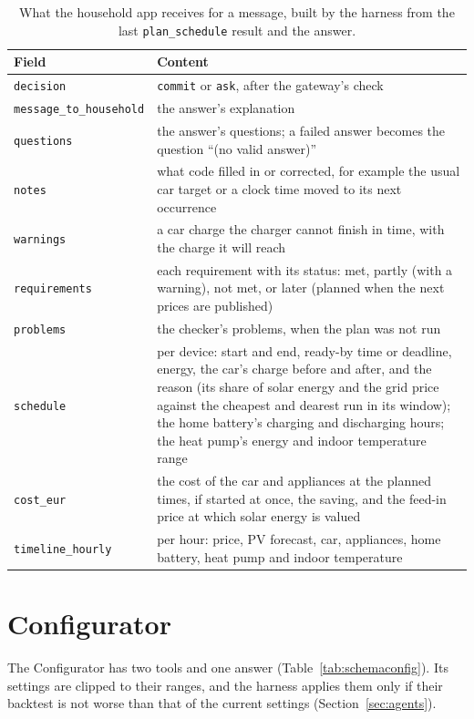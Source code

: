 \begin{table}[htbp]
\caption{What the household app receives for a message, built by the
harness from the last \texttt{plan\_schedule} result and the answer.}
\label{tab:schemaapp}
\small
\begin{tabularx}{\textwidth}{@{}>{\raggedright\arraybackslash}p{3.3cm}X@{}}
\toprule
Field & Content \\
\midrule
\texttt{decision} & \texttt{commit} or \texttt{ask}, after the gateway's check \\
\texttt{message\_to\_\allowbreak household} & the answer's explanation \\
\texttt{questions} & the answer's questions; a failed answer becomes the question ``(no valid answer)'' \\
\texttt{notes} & what code filled in or corrected, for example the usual car target or a clock time moved to its next occurrence \\
\texttt{warnings} & a car charge the charger cannot finish in time, with the charge it will reach \\
\texttt{requirements} & each requirement with its status: met, partly (with a warning), not met, or later (planned when the next prices are published) \\
\texttt{problems} & the checker's problems, when the plan was not run \\
\texttt{schedule} & per device: start and end, ready-by time or deadline, energy, the car's charge before and after, and the reason (its share of solar energy and the grid price against the cheapest and dearest run in its window); the home battery's charging and discharging hours; the heat pump's energy and indoor temperature range \\
\texttt{cost\_eur} & the cost of the car and appliances at the planned times, if started at once, the saving, and the feed-in price at which solar energy is valued \\
\texttt{timeline\_hourly} & per hour: price, PV forecast, car, appliances, home battery, heat pump and indoor temperature \\
\bottomrule
\end{tabularx}
\end{table}

\section{Configurator}

The Configurator has two tools and one answer
(Table~\ref{tab:schemaconfig}). Its settings are clipped to their
ranges, and the harness applies them only if their backtest is not
worse than that of the current settings (Section~\ref{sec:agents}).


